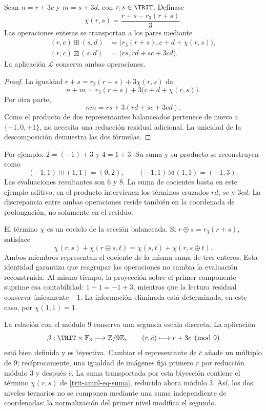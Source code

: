 \begin{proposition}
\label{trit-ampl-prop-aritmetica}
Sean \(n=r+3c\) y \(m=s+3d\), con \(r,s\in\TRIT\). Defínase
\[
 \chi(r,s)=\frac{r+s-r_3(r+s)}3.
\]
Las operaciones enteras se transportan a los pares mediante
\begin{align}
 (r,c)\boxplus(s,d)
 &=\bigl(r_3(r+s),c+d+\chi(r,s)\bigr),
 \label{trit-ampl-eq-suma}\\
 (r,c)\boxtimes(s,d)
 &=\bigl(rs,rd+sc+3cd\bigr).
 \label{trit-ampl-eq-producto}
\end{align}
La aplicación \(\mathcal L\) conserva ambas operaciones.
\end{proposition}
\begin{proof}
La igualdad \(r+s=r_3(r+s)+3\chi(r,s)\) da
\[
 n+m=r_3(r+s)+3\bigl(c+d+\chi(r,s)\bigr).
\]
Por otra parte,
\[
 nm=rs+3(rd+sc+3cd).
\]
Como el producto de dos representantes balanceados pertenece de nuevo a
\(\{-1,0,+1\}\), no necesita una reducción residual adicional. La unicidad
de la descomposición demuestra las dos fórmulas.
\end{proof}

Por ejemplo, \(2=(-1)+3\) y \(4=1+3\). Su suma y su producto se reconstruyen
como
\[
 (-1,1)\boxplus(1,1)=(0,2),\qquad
 (-1,1)\boxtimes(1,1)=(-1,3).
\]
Las evaluaciones resultantes son \(6\) y \(8\). La suma de cocientes basta
en este ejemplo aditivo; en el producto intervienen los términos cruzados
\(rd\), \(sc\) y \(3cd\). La discrepancia entre ambas operaciones reside
también en la coordenada de prolongación, no solamente en el residuo.

El término \(\chi\) es un cociclo de la sección balanceada. Si
\(r\oplus s=r_3(r+s)\), satisface
\[
 \chi(r,s)+\chi(r\oplus s,t)
 =\chi(s,t)+\chi(r,s\oplus t).
\]
Ambos miembros representan el cociente de la misma suma de tres enteros.
Esta identidad garantiza que reagrupar las operaciones no cambia la
evaluación reconstruida. Al mismo tiempo, la proyección sobre el primer
componente suprime esa contabilidad: \(1+1=-1+3\), mientras que la lectura
residual conserva únicamente \(-1\). La información eliminada está
determinada, en este caso, por \(\chi(1,1)=1\).

La relación con el módulo \(9\) conserva una segunda escala discreta.
La aplicación
\[
 \beta:\TRIT\times\mathbb F_3\longrightarrow\mathbb Z/9\mathbb Z,
 \qquad (r,\bar c)\longmapsto r+3c\pmod9
\]
está bien definida y es biyectiva. Cambiar el representante de \(\bar c\)
añade un múltiplo de \(9\); recíprocamente, una igualdad de imágenes fija
primero \(r\) por reducción módulo \(3\) y después \(\bar c\). La suma
transportada por esta biyección contiene el término
\(\chi(r,s)\) de \eqref{trit-ampl-eq-suma}, reducido ahora módulo \(3\).
Así, los dos niveles ternarios no se componen mediante una suma
independiente de coordenadas: la normalización del primer nivel modifica
el segundo.

